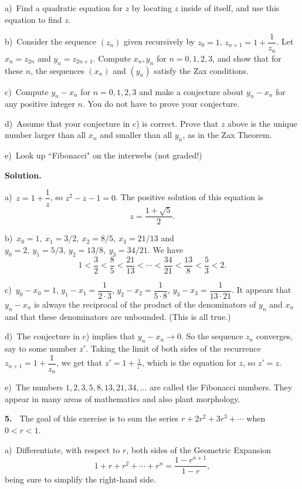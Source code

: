 \documentclass[12pt]{article}
\theoremstyle{definition}
\theoremstyle{remark}
\theoremstyle{definition}
\newenvironment{Solution}{\noindent\textbf{Solution.}}{}
\begin{document}
a)\ Find a quadratic equation for $z$ by locating $z$ inside of itself, and use this equation to find $z$.

b)\  Consider the sequence $(z_n)$ given recursively by $z_0=1$, $z_{n+1}=1+\dfrac{1}{z_n}$. 
Let $x_n=z_{2n}$ and $y_n=z_{2n+1}$. Compute $x_n, y_n$ for $n=0,1,2,3$, and show that for these $n$, the sequences $(x_n)$ and $(y_n)$ satisfy the Zax conditions. 

c)\ Compute $y_n-x_n$ for $n=0,1,2,3$ and make a conjecture about $y_n-x_n$ for any positive integer $n$. You do not have to prove your conjecture.

d)\ Assume that your conjecture in c) is correct. Prove that $z$ above is the unique number larger than all $x_n$ and smaller than all $y_n$, as in the Zax Theorem.

e)\ Look up ``Fibonacci" on the interwebs (not graded!) 

\begin{Solution} 

a)\  $z=1+\dfrac{1}{z}$, so $z^2-z-1=0$. The positive solution of this equation is 
\[z=\frac{1+\sqrt{5}}{2}.\]

b)\ $x_0=1,\  x_1=3/2,\ x_2=8/5,\ x_3=21/13$ and $y_0=2,\ y_1=5/3,\ y_2=13/8,\ y_3=34/21$. We have 
\[1< \frac{3}{2}< \frac{8}{5}<\frac{21}{13}<\cdots<\frac{34}{21}<\frac{13}{8}<\frac{5}{3}<2.\]

c)\ $y_0-x_0=1$, $y_1-x_1=\dfrac{1}{2\cdot 3}$, $y_2-x_2=\dfrac{1}{5\cdot 8}$, $y_3-x_3=\dfrac{1}{13\cdot 21}$. It appears that $y_n-x_n$ is always the reciprocal of the product of the denominators of $y_n$ and $x_n$ and that these denominators are unbounded.  (This is all true.)

d)\ The conjecture in c) implies that $y_n-x_n\to 0$. So the sequence $z_n$ converges, say to some number $z'$.  Taking the limit of both sides of the recurrence $z_{n+1}=1+\dfrac{1}{z_n}$, we get that $z'=1+\frac{1}{z'}$, which is the equation for $z$, so $z'=z$. 

e)\ The numbers $1,2,3,5,8,13,21,34,\dots$ are called the Fibonacci numbers. They appear in many areas of mathematics and also plant morphology. 



\end{Solution} 


{\bf 5.\ } The goal of this exercise is to sum the series $r+2r^2+3r^3+\cdots$ when $0<r<1$. 

a)\ Differentiate, with respect to $r$, both sides of the Geometric Expansion
\[1+r+r^2+\cdots+r^{n}=\frac{1-r^{n+1}}{1-r},\]
being sure to simplify the right-hand side. 
\end{document}

